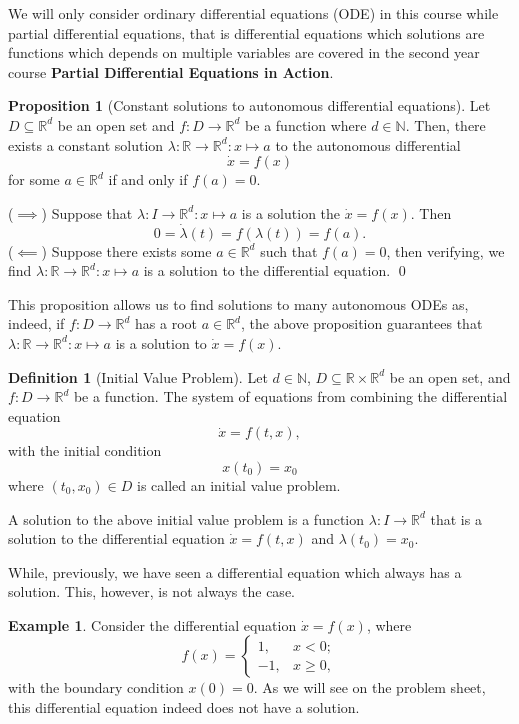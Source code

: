 \documentclass[
]{article}
\theoremstyle{definition}
\newtheorem{example}{Example}
\newtheorem{prop}{Proposition}
\theoremstyle{definition}
\newtheorem{definition}{Definition}[section]
\begin{document}
We will only consider ordinary differential equations (ODE) in this
course while partial differential equations, that is differential
equations which solutions are functions which depends on multiple
variables are covered in the second year course \textbf{Partial
Differential Equations in Action}.

\begin{prop}[Constant solutions to autonomous differential equations]\label{const_sol}
  Let \(D \subseteq \mathbb{R}^d\) be an open set and \(f : D \to \mathbb{R}^d\) 
  be a function where \(d \in \mathbb{N}\). Then, there exists a constant 
  solution \(\lambda : \mathbb{R} \to \mathbb{R}^d : x \mapsto a\) to the 
  autonomous differential
  \[\dot x = f(x)\]
  for some \(a \in \mathbb{R}^d\) if and only if \(f(a) = 0\).
\end{prop}
\proof

(\(\implies\)) Suppose that
\(\lambda : I \to \mathbb{R}^d : x \mapsto a\) is a solution the
\(\dot x = f(x)\). Then
\[0 = \dot \lambda (t) = f(\lambda (t)) = f(a).\] (\(\impliedby\))
Suppose there exists some \(a \in \mathbb{R}^d\) such that \(f(a) = 0\),
then verifying, we find
\(\lambda : \mathbb{R} \to \mathbb{R}^d : x \mapsto a\) is a solution to
the differential equation. \qed

This proposition allows us to find solutions to many autonomous ODEs as,
indeed, if \(f : D \to \mathbb{R}^d\) has a root \(a \in \mathbb{R}^d\),
the above proposition guarantees that
\(\lambda : \mathbb{R} \to \mathbb{R}^d : x \mapsto a\) is a solution to
\(\dot x = f(x)\).

\begin{definition}[Initial Value Problem]
  Let \(d \in \mathbb{N}\), \(D \subseteq \mathbb{R} \times \mathbb{R}^d\) be an 
  open set, and \(f : D \to \mathbb{R}^d\) be a function. The system of equations 
  from combining the differential equation 
  \[\dot x = f(t, x),\]
  with the initial condition
  \[x(t_0) = x_0\] 
  where \((t_0, x_0) \in D\) is called an initial value problem.

  A solution to the above initial value problem is a function 
  \(\lambda : I \to \mathbb{R}^d\) that is a solution to the differential equation 
  \(\dot x = f(t, x)\) and \(\lambda(t_0) = x_0\).
\end{definition}

While, previously, we have seen a differential equation which always has
a solution. This, however, is not always the case.

\begin{example}
  Consider the differential equation \(\dot x = f(x)\), where 
  \[f(x) = \begin{cases}
    1, & x < 0;\\
    -1, & x \ge 0,
  \end{cases}\]
  with the boundary condition \(x(0) = 0\). As we will see on the problem sheet, 
  this differential equation indeed does not have a solution.
\end{example}
\end{document}
